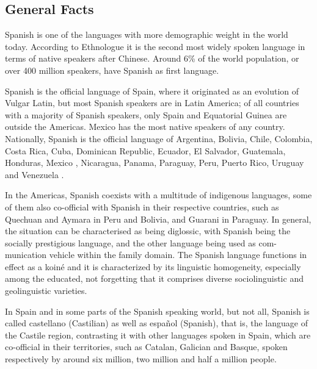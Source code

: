\clearpage


\begin{multicols}{2}

\subsection{General Facts}


Spanish is one of the languages with more demographic weight in the world today. According to Ethnologue \cite{ethnologue} it is the second most widely spoken language in terms of native speakers after Chinese. Around 6\% of the world population, or over 400 million speakers, have Spanish as first language.

Spanish is the official language of Spain, where it originated as an evolution of Vulgar Latin, but most Spanish speakers are in Latin America; of all countries with a majority of Spanish speakers, only Spain and Equatorial Guinea are outside the Americas. Mexico has the most native speakers of any country. Nationally, Spanish is the official language of Argentina, Bolivia, Chile, Colombia, Costa Rica, Cuba, Dominican Republic, Ecuador, El Salvador, Guatemala, Honduras, Mexico , Nicaragua, Panama, Paraguay, Peru, Puerto Rico, Uruguay and Venezuela \cite{atlasspanish}.

In the Americas, Spanish coexists with a multitude of indigenous languages, some of them also co-official with Spanish in their respective countries, such as Quechuan and Aymara in Peru and Bolivia, and Guarani in Paraguay. In general, the situation can be characterised as being diglossic, with Spanish being the socially prestigious language, and the other language being used as com-munication vehicle within the family domain. The Spanish language functions in effect as a koiné and it is characterized by its linguistic homogeneity, especially among the educated, not forgetting that it comprises diverse sociolinguistic and geolinguistic varieties.

In Spain and in some parts of the Spanish speaking world, but not all, Spanish is called castellano (Castilian) as well as español (Spanish), that is, the language of the Castile region, contrasting it with other languages spoken in Spain, which are co-official in their territories, such as Catalan, Galician and Basque, spoken respectively by around six million, two million and half a million people. 


\end{multicols}

